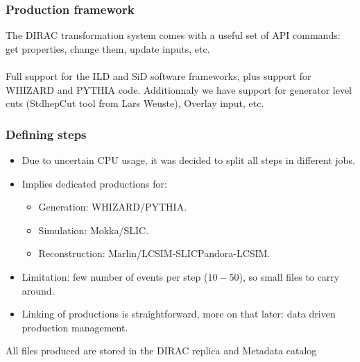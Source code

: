 \documentclass{beamer}
\begin{document}
\begin{frame}
\frametitle{Production framework}
The DIRAC transformation system comes with a useful set of API commands: get properties, change them, update inputs, etc.\\
~\\
\alert{Full support for the ILD and SiD software frameworks}, plus support for WHIZARD and PYTHIA code. Additionnaly we have support for generator level cuts (StdhepCut tool from Lars Weuste), Overlay input, etc.~\\

\end{frame}

\begin{frame}
\frametitle{Defining steps}
\begin{itemize}
\item Due to uncertain CPU usage, it was decided to split all steps in different jobs.
\item Implies dedicated productions for:
\begin{itemize}
\item Generation: WHIZARD/PYTHIA.
\item Simulation: Mokka/SLIC.
\item Reconstruction: Marlin/LCSIM-SLICPandora-LCSIM.
\end{itemize}
\item Limitation: few number of events per step ($10-50$), so small files to carry around.
\item Linking of productions is straightforward, more on that later: \alert{data driven production management}.
\end{itemize}
All files produced are stored in the DIRAC replica and Metadata catalog
\end{frame}
\end{document}

